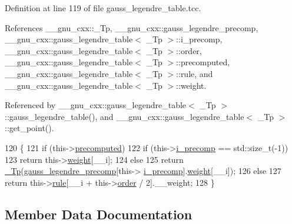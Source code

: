 Definition at line 119 of file gauss\+\_\+legendre\+\_\+table.\+tcc.



References \+\_\+\+\_\+gnu\+\_\+cxx\+::\+\_\+\+Tp, \+\_\+\+\_\+gnu\+\_\+cxx\+::gauss\+\_\+legendre\+\_\+precomp, \+\_\+\+\_\+gnu\+\_\+cxx\+::gauss\+\_\+legendre\+\_\+table$<$ \+\_\+\+Tp $>$\+::i\+\_\+precomp, \+\_\+\+\_\+gnu\+\_\+cxx\+::gauss\+\_\+legendre\+\_\+table$<$ \+\_\+\+Tp $>$\+::order, \+\_\+\+\_\+gnu\+\_\+cxx\+::gauss\+\_\+legendre\+\_\+table$<$ \+\_\+\+Tp $>$\+::precomputed, \+\_\+\+\_\+gnu\+\_\+cxx\+::gauss\+\_\+legendre\+\_\+table$<$ \+\_\+\+Tp $>$\+::rule, and \+\_\+\+\_\+gnu\+\_\+cxx\+::gauss\+\_\+legendre\+\_\+table$<$ \+\_\+\+Tp $>$\+::weight.



Referenced by \+\_\+\+\_\+gnu\+\_\+cxx\+::gauss\+\_\+legendre\+\_\+table$<$ \+\_\+\+Tp $>$\+::gauss\+\_\+legendre\+\_\+table(), and \+\_\+\+\_\+gnu\+\_\+cxx\+::gauss\+\_\+legendre\+\_\+table$<$ \+\_\+\+Tp $>$\+::get\+\_\+point().


\begin{DoxyCode}
120     \{
121       \textcolor{keywordflow}{if} (this->\hyperlink{struct____gnu__cxx_1_1gauss__legendre__table_acbcd2eeb79842a232207882c5a4d01c0}{precomputed})
122         \textcolor{keywordflow}{if} (this->\hyperlink{struct____gnu__cxx_1_1gauss__legendre__table_a6f86bbb7d5ed663b88683156a38f4a05}{i\_precomp} == std::size\_t(-1))
123           \textcolor{keywordflow}{return} this->\hyperlink{struct____gnu__cxx_1_1gauss__legendre__table_a4bc3bb73288637899d2eb459eb751607}{weight}[\_\_i];
124         \textcolor{keywordflow}{else}
125           \textcolor{keywordflow}{return} \hyperlink{namespace____gnu__cxx_a3b19a9c800ca194374ef9172290f7d79}{\_Tp}(\hyperlink{namespace____gnu__cxx_a2e3dcc11970f62e2c7e9d81502b2f84b}{gauss\_legendre\_precomp}[this->
      \hyperlink{struct____gnu__cxx_1_1gauss__legendre__table_a6f86bbb7d5ed663b88683156a38f4a05}{i\_precomp}].\hyperlink{struct____gnu__cxx_1_1gauss__legendre__table_a4bc3bb73288637899d2eb459eb751607}{weight}[\_\_i]);
126       \textcolor{keywordflow}{else}
127         \textcolor{keywordflow}{return} this->\hyperlink{struct____gnu__cxx_1_1gauss__legendre__table_a1c1f6c907f2bcee143c39136679901b4}{rule}[\_\_i + this->\hyperlink{struct____gnu__cxx_1_1gauss__legendre__table_aecdc9cdb90f5a7b4f06a455cd868370f}{order} / 2].\_\_weight;
128     \}
\end{DoxyCode}


\subsection{Member Data Documentation}
\mbox{\label{struct____gnu__cxx_1_1gauss__legendre__table_a6f86bbb7d5ed663b88683156a38f4a05}} 
